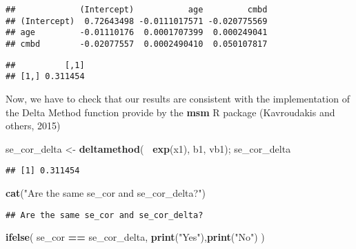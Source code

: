 \documentclass[
]{article}
\newenvironment{Shaded}{\begin{snugshade}}{\end{snugshade}}
\newcommand{\DecValTok}[1]{\textcolor[rgb]{0.00,0.00,0.81}{#1}}
\newcommand{\KeywordTok}[1]{\textcolor[rgb]{0.13,0.29,0.53}{\textbf{#1}}}
\newcommand{\NormalTok}[1]{#1}
\newcommand{\OperatorTok}[1]{\textcolor[rgb]{0.81,0.36,0.00}{\textbf{#1}}}
\newcommand{\StringTok}[1]{\textcolor[rgb]{0.31,0.60,0.02}{#1}}
\begin{document}
\begin{verbatim}
##             (Intercept)           age         cmbd
## (Intercept)  0.72643498 -0.0111017571 -0.020775569
## age         -0.01110176  0.0001707399  0.000249041
## cmbd        -0.02077557  0.0002490410  0.050107817
\end{verbatim}

\begin{Shaded}
\end{Shaded}

\begin{verbatim}
##          [,1]
## [1,] 0.311454
\end{verbatim}

Now, we have to check that our results are consistent with the
implementation of the Delta Method function provide by the \textbf{msm}
R package (Kavroudakis and others, 2015)

\begin{Shaded}
\begin{Highlighting}[]
\NormalTok{se_cor_delta <-}\StringTok{ }\KeywordTok{deltamethod}\NormalTok{(}\OperatorTok{~}\StringTok{ }\KeywordTok{exp}\NormalTok{(x1), b1, vb1); se_cor_delta}
\end{Highlighting}
\end{Shaded}

\begin{verbatim}
## [1] 0.311454
\end{verbatim}

\begin{Shaded}
\begin{Highlighting}[]
\KeywordTok{cat}\NormalTok{(}\StringTok{"Are the same se_cor and se_cor_delta?"}\NormalTok{)}
\end{Highlighting}
\end{Shaded}

\begin{verbatim}
## Are the same se_cor and se_cor_delta?
\end{verbatim}

\begin{Shaded}
\begin{Highlighting}[]
\KeywordTok{ifelse}\NormalTok{(}
\NormalTok{  se_cor }\OperatorTok{==}\StringTok{ }\NormalTok{se_cor_delta,}
  \KeywordTok{print}\NormalTok{(}\StringTok{"Yes"}\NormalTok{),}\KeywordTok{print}\NormalTok{(}\StringTok{"No"}\NormalTok{)}
\NormalTok{)}
\end{Highlighting}
\end{Shaded}
\end{document}
